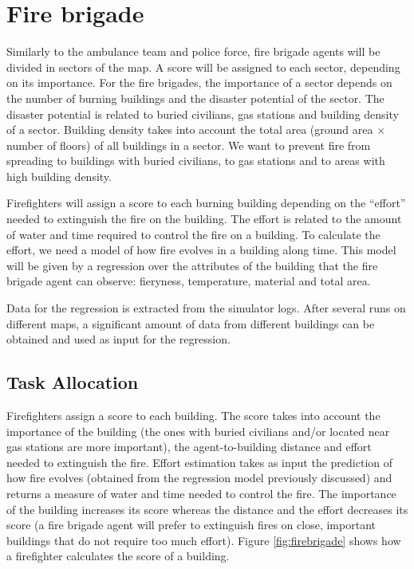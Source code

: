 \section{Fire brigade}
\label{sec:firefighters}
Similarly to the ambulance team and police force, fire brigade agents will be divided in sectors of the map. %
A score will be assigned to each sector, depending on its importance. For the fire brigades, the importance of a sector depends on the number of burning buildings and the disaster potential of the sector. The disaster potential is related to buried civilians, gas stations and building density of a sector. Building density takes into account the total area (ground area $\times$ number of floors) of all buildings in a sector. We want to prevent fire from spreading to buildings with buried civilians, to gas stations and to areas with high building density.

Firefighters will assign a score to each burning building depending on the ``effort'' needed to extinguish the fire on the building. The effort is related to the amount of water and time required to control the fire on a building. To calculate the effort, we need a model of how fire evolves in a building along time. This model will be given by a regression over the attributes of the building that the fire brigade agent can observe: fieryness, temperature, material and total area.

Data for the regression is extracted from the simulator logs. After several runs on different maps, a significant amount of data from different buildings can be obtained and used as input for the regression.

\subsection{Task Allocation}

Firefighters assign a score to each building. The score takes into account the importance of the building (the ones with buried civilians and/or located near gas stations are more important), the agent-to-building distance and effort needed to extinguish the fire. Effort estimation takes as input the prediction of how fire evolves (obtained from the regression model previously discussed) and returns a measure of water and time needed to control the fire. The importance of the building increases its score whereas the distance and the effort decreases its score (a fire brigade agent will prefer to extinguish fires on close, important buildings that do not require too much effort). Figure \ref{fig:firebrigade} shows how a firefighter calculates the score of a building.

